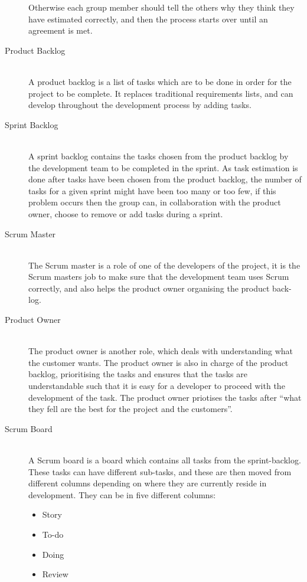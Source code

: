 \begin{description}
	Otherwise each group member should tell the others why they think they have estimated correctly, and then the process starts over until an agreement is met.
	\item[Product Backlog] \hfill \\
	A product backlog is a list of tasks which are to be done in order for the project to be complete. 
	It replaces traditional requirements lists, and can develop throughout the development process by adding tasks.
	\item[Sprint Backlog] \hfill \\
	A sprint backlog contains the tasks chosen from the product backlog by the development team to be completed in the sprint.
	As task estimation is done after tasks have been chosen from the product backlog, the number of tasks for a given sprint might have been too many or too few, if this problem occurs then the group can, in collaboration with the product owner, choose to remove or add tasks during a sprint. 
	\item[Scrum Master] \hfill \\
	The Scrum master is a role of one of the developers of the project, it is the Scrum masters job to make sure that the development team uses Scrum correctly, and also helps the product owner organising the product back-log.
	\item[Product Owner] \hfill \\
	The product owner is another role, which deals with understanding what the customer wants.
	The product owner is also in charge of the product backlog, prioritising the tasks and ensures that the tasks are understandable such that it is easy for a developer to proceed with the development of the task.
	The product owner priotises the tasks after ``what they fell are the best for the project and the customers''. 
	\item[Scrum Board] \hfill \\
	A Scrum board is a board which contains all tasks from the sprint-backlog.
	These tasks can have different sub-tasks, and these are then moved from different columns depending on where they are currently reside in development.
	They can be in five different columns:
	\begin{itemize}
		\item Story
		\item To-do
		\item Doing
		\item Review

\end{itemize}
\end{description}
